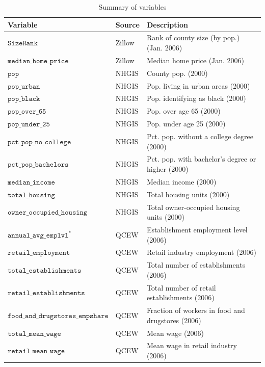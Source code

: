 \documentclass[]{article}
\begin{document}
\begin{table}

\caption{\label{tab:table_covariates}Summary of variables}
\centering
\begin{threeparttable}
\begin{tabular}[t]{lll}
\toprule
Variable & Source & Description\\
\midrule
$\texttt{SizeRank}$ & Zillow & Rank of county size (by pop.) (Jan. 2006)\\
$\texttt{median\_home\_price}$ & Zillow & Median home price (Jan. 2006)\\
$\texttt{pop}$ & NHGIS & County pop. (2000)\\
$\texttt{pop\_urban}$ & NHGIS & Pop. living in urban areas (2000)\\
$\texttt{pop\_black}$ & NHGIS & Pop. identifying as black (2000)\\
\addlinespace
$\texttt{pop\_over\_65}$ & NHGIS & Pop. over age 65 (2000)\\
$\texttt{pop\_under\_25}$ & NHGIS & Pop. under age 25 (2000)\\
$\texttt{pct\_pop\_no\_college}$ & NHGIS & Pct. pop. without a college degree (2000)\\
$\texttt{pct\_pop\_bachelors}$ & NHGIS & Pct. pop. with bachelor's degree or higher (2000)\\
$\texttt{median\_income}$ & NHGIS & Median income (2000)\\
\addlinespace
$\texttt{total\_housing}$ & NHGIS & Total housing units (2000)\\
$\texttt{owner\_occupied\_housing}$ & NHGIS & Total owner-occupied housing units (2000)\\
$\texttt{annual\_avg\_emplvl}^{\text{*}}$ & QCEW & Establishment employment level (2006)\\
$\texttt{retail\_employment}$ & QCEW & Retail industry employment (2006)\\
$\texttt{total\_establishments}$ & QCEW & Total number of establishments (2006)\\
\addlinespace
$\texttt{retail\_establishments}$ & QCEW & Total number of retail establishments (2006)\\
$\texttt{food\_and\_drugstores\_empshare}$ & QCEW & Fraction of workers in food and drugstores (2006)\\
$\texttt{total\_mean\_wage}$ & QCEW & Mean wage (2006)\\
$\texttt{retail\_mean\_wage}$ & QCEW & Mean wage in retail industry (2006)\\

\end{tabular}
\end{threeparttable}
\end{table}
\end{document}
